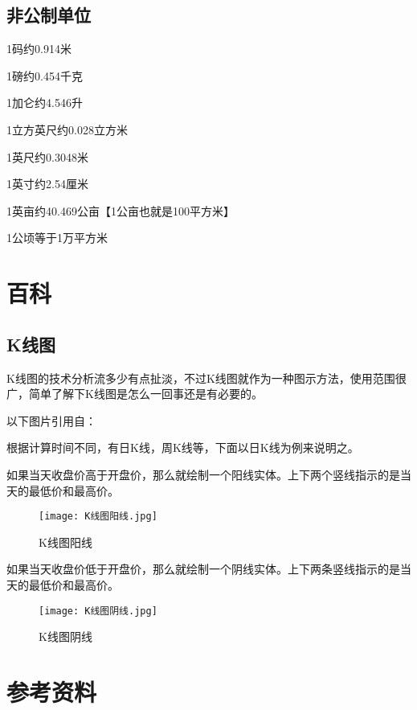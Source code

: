 \documentclass[12pt,oneside]{book}
\begin{document}
\section{非公制单位}
1码约0.914米

1磅约0.454千克

1加仑约4.546升

1立方英尺约0.028立方米

1英尺约0.3048米

1英寸约2.54厘米

1英亩约40.469公亩【1公亩也就是100平方米】

1公顷等于1万平方米

\chapter{百科}
\section{K线图}
K线图的技术分析流多少有点扯淡，不过K线图就作为一种图示方法，使用范围很广，简单了解下K线图是怎么一回事还是有必要的。

以下图片引用自\cite{从零开始学K线}：

根据计算时间不同，有日K线，周K线等，下面以日K线为例来说明之。

如果当天收盘价高于开盘价，那么就绘制一个阳线实体。上下两个竖线指示的是当天的最低价和最高价。

\begin{figure}[H]
\centering
\texttt{[image: K线图阳线.jpg]}
\caption{K线图阳线}
\end{figure}

如果当天收盘价低于开盘价，那么就绘制一个阴线实体。上下两条竖线指示的是当天的最低价和最高价。

\begin{figure}[H]
\centering
\texttt{[image: K线图阴线.jpg]}
\caption{K线图阴线}
\end{figure}






\backmatter
\chapter*{参考资料}
\end{document}
